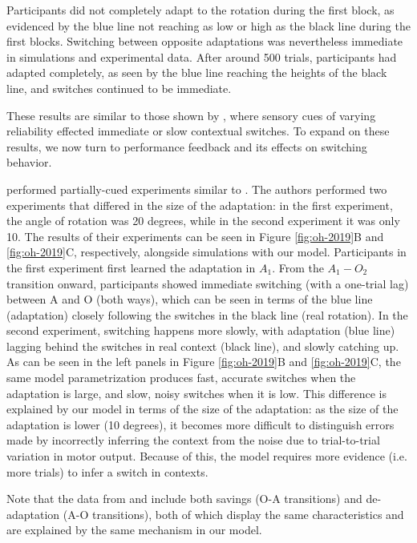 \documentclass[a4paper,doc,floatsintext,natbib]{apa6}
\def \fref #1{Figure \ref{#1}}     %
\begin{document}
Participants did not completely adapt to the rotation during the first block, as evidenced by the blue line not reaching as low or high as the black line during the first blocks. Switching between opposite adaptations was nevertheless immediate in simulations and experimental data. After around 500 trials, participants had adapted completely, as seen by the blue line reaching the heights of the black line, and switches continued to be immediate.

These results are similar to those shown by \cite{Imamizu_Explicit_2007}, where sensory cues of varying reliability effected immediate or slow contextual switches. To expand on these results, we now turn to performance feedback and its effects on switching behavior.

\cite{Oh_Minimizing_2019} performed partially-cued experiments similar to \cite{Kim_Neural_2015}. The authors performed two experiments that differed in the size of the adaptation: in the first experiment, the angle of rotation was 20 degrees, while in the second experiment it was only 10. The results of their experiments can be seen in \fref{fig:oh-2019}B and \ref{fig:oh-2019}C, respectively, alongside simulations with our model. Participants in the first experiment first learned the adaptation in $A_1$. From the $A_1 - O_2$ transition onward, participants showed immediate switching (with a one-trial lag) between A and O (both ways), which can be seen in terms of the blue line (adaptation) closely following the switches in the black line (real rotation). In the second experiment, switching happens more slowly, with adaptation (blue line) lagging behind the switches in real context (black line), and slowly catching up. As can be seen in the left panels in \fref{fig:oh-2019}B and \ref{fig:oh-2019}C, the same model parametrization produces fast, accurate switches when the adaptation is large, and slow, noisy switches when it is low. This difference is explained by our model in terms of the size of the adaptation: as the size of the adaptation is lower (10 degrees), it becomes more difficult to distinguish errors made by incorrectly inferring the context from the noise due to trial-to-trial variation in motor output. Because of this, the model requires more evidence (i.e. more trials) to infer a switch in contexts.

Note that the data from \cite{Oh_Minimizing_2019} and \cite{Kim_Neural_2015} include both savings (O-A transitions) and de-adaptation (A-O transitions), both of which display the same characteristics and are explained by the same mechanism in our model.
\end{document}
